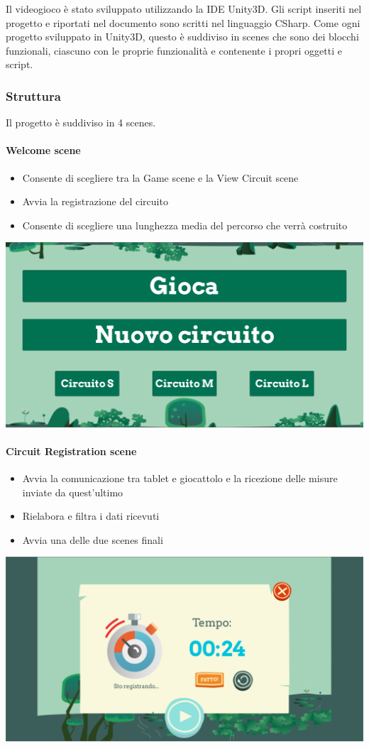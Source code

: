 \documentclass[documentation.tex]{subfiles}
\begin{document}
	Il videogioco è stato sviluppato utilizzando la IDE Unity3D. Gli script inseriti nel progetto e riportati nel documento sono scritti nel linguaggio CSharp. Come ogni progetto sviluppato in Unity3D, questo è suddiviso in scenes che sono dei blocchi funzionali, ciascuno con le proprie funzionalità e contenente i propri oggetti e script.
	\subsubsection{Struttura}
	Il progetto è suddiviso in 4 scenes.
		\paragraph{Welcome scene}
			\begin{itemize}
				\item Consente di scegliere tra la Game scene e la View Circuit scene
				\item Avvia la registrazione del circuito
				\item Consente di scegliere una lunghezza media del percorso che verrà costruito
			\end{itemize}
			\includegraphics[width=\textwidth]{./images/welcome.png}
		\paragraph{Circuit Registration scene}
			\begin{itemize}
				\item Avvia la comunicazione tra tablet e giocattolo e la ricezione delle misure inviate da quest'ultimo
				\item Rielabora e filtra i dati ricevuti
				\item Avvia una delle due scenes finali
			\end{itemize}
			\includegraphics[width=\textwidth]{./images/countdown.png}
\end{document}
